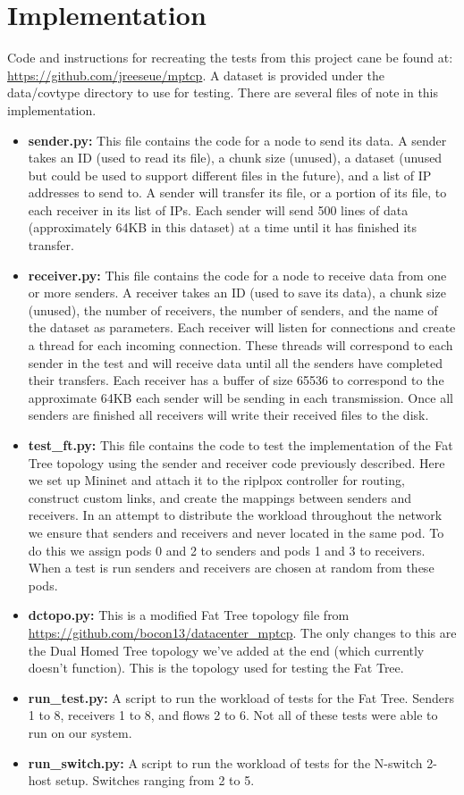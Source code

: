 \documentclass[10pt]{report}
\begin{document}
\section{Implementation}
\label{sec:imp}
Code and instructions for recreating the tests from this project cane
be found at: \url{https://github.com/jreeseue/mptcp}. A dataset is
provided under the data/covtype directory to use for testing. There are
several files of note in this implementation.
\begin{itemize}
\item {\bf sender.py:} This file contains the code for a node to send
  its data. A sender takes an ID (used to read its file), a chunk size
  (unused), a dataset (unused but could be used to support different
  files in the future), and a list of IP addresses to send to. A
  sender will transfer its file, or a portion of its file, to each
  receiver in its list of IPs. Each sender will send 500 lines of data
  (approximately 64KB in this dataset) at a time until it has finished
  its transfer.
\item {\bf receiver.py:} This file contains the code for a node to
  receive data from one or more senders. A receiver takes an ID (used
  to save its data), a chunk size (unused), the number of receivers,
  the number of senders, and the name of the dataset as
  parameters. Each receiver will listen for connections and create a
  thread for each incoming connection. These threads will correspond
  to each sender in the test and will receive data until all the
  senders have completed their transfers. Each receiver has a buffer
  of size 65536 to correspond to the approximate 64KB each sender will
  be sending in each transmission. Once all senders are finished all
  receivers will write their received files to the disk.
\item {\bf test\_ft.py:} This file contains the code to test the
  implementation of the Fat Tree topology using the sender and
  receiver code previously described. Here we set up Mininet and
  attach it to the riplpox controller for routing, construct custom
  links, and create the mappings between senders and receivers. In an
  attempt to distribute the workload throughout the network we ensure
  that senders and receivers and never located in the same pod. To do
  this we assign pods 0 and 2 to senders and pods 1 and 3 to
  receivers. When a test is run senders and receivers are chosen at
  random from these pods.
\item {\bf dctopo.py:} This is a modified Fat Tree topology file from
  \url{https://github.com/bocon13/datacenter_mptcp}. The only changes
  to this are the Dual Homed Tree topology we've added at the end
  (which currently doesn't function). This is the topology used for
  testing the Fat Tree.
\item {\bf run\_test.py:} A script to run the workload of tests for
  the Fat Tree. Senders 1 to 8, receivers 1 to 8, and flows 2 to
  6. Not all of these tests were able to run on our system.
\item {\bf run\_switch.py:} A script to run the workload of tests for
  the N-switch 2-host setup. Switches ranging from 2 to 5.
\end{itemize}
\end{document}
